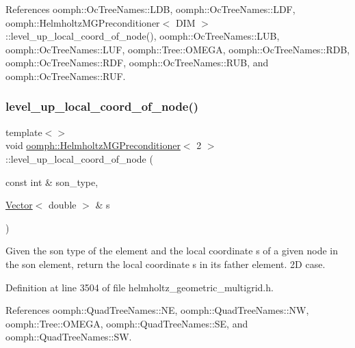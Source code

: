 References oomph\+::\+Oc\+Tree\+Names\+::\+L\+DB, oomph\+::\+Oc\+Tree\+Names\+::\+L\+DF, oomph\+::\+Helmholtz\+M\+G\+Preconditioner$<$ D\+I\+M $>$\+::level\+\_\+up\+\_\+local\+\_\+coord\+\_\+of\+\_\+node(), oomph\+::\+Oc\+Tree\+Names\+::\+L\+UB, oomph\+::\+Oc\+Tree\+Names\+::\+L\+UF, oomph\+::\+Tree\+::\+O\+M\+E\+GA, oomph\+::\+Oc\+Tree\+Names\+::\+R\+DB, oomph\+::\+Oc\+Tree\+Names\+::\+R\+DF, oomph\+::\+Oc\+Tree\+Names\+::\+R\+UB, and oomph\+::\+Oc\+Tree\+Names\+::\+R\+UF.

\mbox{\label{classoomph_1_1HelmholtzMGPreconditioner_af2ea46ead16d2e6940cb72963e78efc5}} 
\subsubsection{\texorpdfstring{level\+\_\+up\+\_\+local\+\_\+coord\+\_\+of\+\_\+node()}{level\_up\_local\_coord\_of\_node()}\hspace{0.1cm}{\footnotesize\ttfamily [3/3]}}
{\footnotesize\ttfamily template$<$$>$ \\
void \hyperlink{classoomph_1_1HelmholtzMGPreconditioner}{oomph\+::\+Helmholtz\+M\+G\+Preconditioner}$<$ 2 $>$\+::level\+\_\+up\+\_\+local\+\_\+coord\+\_\+of\+\_\+node (\begin{DoxyParamCaption}\item[{const int \&}]{son\+\_\+type,  }\item[{\hyperlink{classoomph_1_1Vector}{Vector}$<$ double $>$ \&}]{s }\end{DoxyParamCaption})}



Given the son type of the element and the local coordinate s of a given node in the son element, return the local coordinate s in its father element. 2D case. 



Definition at line 3504 of file helmholtz\+\_\+geometric\+\_\+multigrid.\+h.



References oomph\+::\+Quad\+Tree\+Names\+::\+NE, oomph\+::\+Quad\+Tree\+Names\+::\+NW, oomph\+::\+Tree\+::\+O\+M\+E\+GA, oomph\+::\+Quad\+Tree\+Names\+::\+SE, and oomph\+::\+Quad\+Tree\+Names\+::\+SW.

